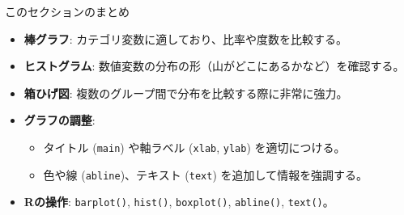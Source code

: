 \documentclass[
  ignorenonframetext,
]{beamer}
\providecommand{\tightlist}{%
  \setlength{\itemsep}{0pt}\setlength{\parskip}{0pt}}
\begin{document}
\begin{frame}[fragile]{このセクションのまとめ}
\protect\hypertarget{ux3053ux306eux30bbux30afux30b7ux30e7ux30f3ux306eux307eux3068ux3081}{}
\begin{itemize}
\tightlist
\item
  \textbf{棒グラフ}: カテゴリ変数に適しており、比率や度数を比較する。
\item
  \textbf{ヒストグラム}:
  数値変数の分布の形（山がどこにあるかなど）を確認する。
\item
  \textbf{箱ひげ図}: 複数のグループ間で分布を比較する際に非常に強力。
\item
  \textbf{グラフの調整}:

  \begin{itemize}
  \tightlist
  \item
    タイトル (\texttt{main}) や軸ラベル (\texttt{xlab}, \texttt{ylab})
    を適切につける。
  \item
    色や線 (\texttt{abline})、テキスト (\texttt{text})
    を追加して情報を強調する。
  \end{itemize}
\item
  \textbf{Rの操作}: \texttt{barplot()}, \texttt{hist()},
  \texttt{boxplot()}, \texttt{abline()}, \texttt{text()}。
\end{itemize}
\end{frame}
\end{document}
